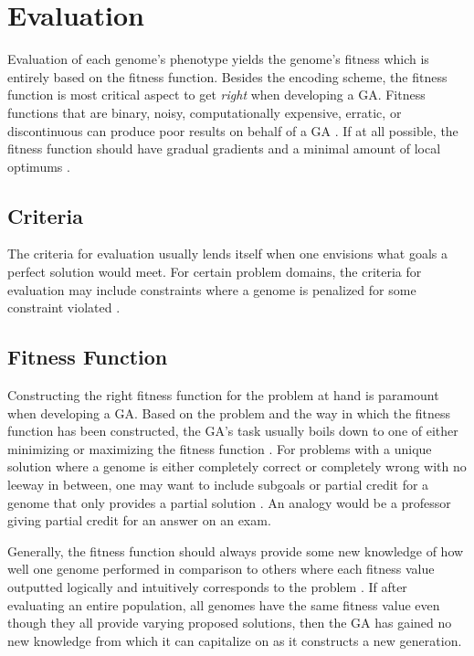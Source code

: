 \section{Evaluation}

Evaluation of each genome's phenotype yields the genome's fitness which is entirely based on the fitness function. Besides the encoding scheme, the fitness function is most critical aspect to get \textit{right} when developing a GA. Fitness functions that are binary, noisy, computationally expensive, erratic, or discontinuous can produce poor results on behalf of a GA \cite{Beasley93anoverview}. If at all possible, the fitness function should have gradual gradients and a minimal amount of local optimums \cite{Beasley93anoverview}.     

\subsection{Criteria}

The criteria for evaluation usually lends itself when one envisions what goals a perfect solution would meet. For certain problem domains, the criteria for evaluation may include constraints where a genome is penalized for some constraint violated \cite{Beasley93anoverview}.  

\subsection{Fitness Function}

Constructing the right fitness function for the problem at hand is paramount when developing a GA. Based on the problem and the way in which the fitness function has been constructed, the GA's task usually boils down to one of either minimizing or maximizing the fitness function \cite{ColinReeves}. For problems with a unique solution where a genome is either completely correct or completely wrong with no leeway in between, one may want to include subgoals or partial credit for a genome that only provides a partial solution \cite{Beasley93anoverview}. An analogy would be a professor giving partial credit for an answer on an exam. 

Generally, the fitness function should always provide some new knowledge of how well one genome performed in comparison to others where each fitness value outputted logically and intuitively corresponds to the problem \cite{Beasley93anoverview}. If after evaluating an entire population, all genomes have the same fitness value even though they all provide varying proposed solutions, then the GA has gained no new knowledge from which it can capitalize on as it constructs a new generation.      


